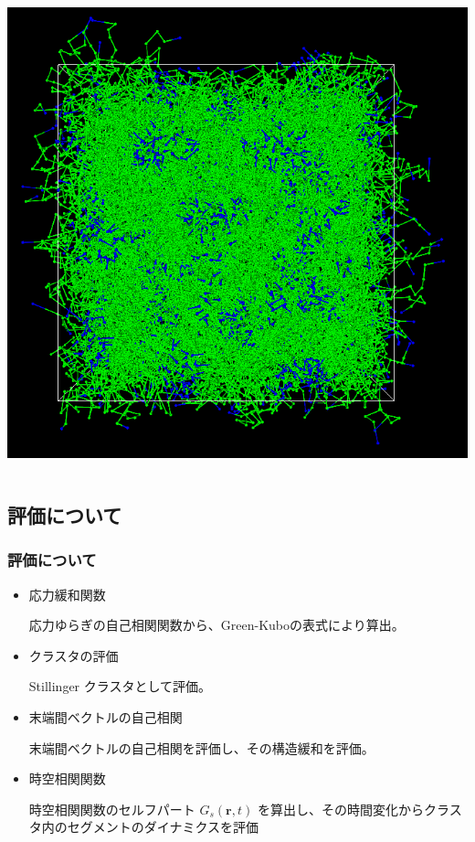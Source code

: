 \documentclass[12pt, dvipdfmx]{beamer}
\begin{document}
\begin{frame}
\begin{columns}[T, totalwidth=0.96\linewidth]
\includegraphics[width=\columnwidth]{./fig/all.png}
\end{columns}
\end{frame}

\subsection{評価について}

\begin{frame}
\frametitle{評価について}

\begin{itemize}
\item
応力緩和関数

	応力ゆらぎの自己相関関数から、Green-Kuboの表式により算出。
\item
クラスタの評価

	Stillinger クラスタとして評価。

\item
末端間ベクトルの自己相関

	末端間ベクトルの自己相関を評価し、その構造緩和を評価。

\item
時空相関関数

	時空相関関数のセルフパート $G_s(\bm{r}, t)$ を算出し、その時間変化からクラスタ内のセグメントのダイナミクスを評価
\end{itemize}

\end{frame}
\end{document}
